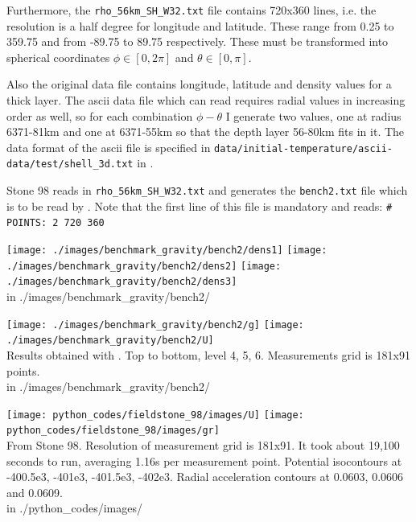 Furthermore, the {\tt rho\_56km\_SH\_W32.txt} file contains 720x360 lines, i.e. 
the resolution is a half degree for longitude and latitude. These range from 0.25
to 359.75 and from -89.75 to 89.75 respectively. These must be transformed into 
spherical coordinates $\phi\in[0,2\pi]$ and $\theta \in[0,\pi]$.

Also the original data file contains longitude, latitude and density values for 
a thick layer. The ascii data file which \aspect can read requires radial values 
in increasing order as well, 
so for each combination $\phi-\theta$ I generate two values, one at 
radius 6371-81km and one at 6371-55km so that the depth layer 56-80km fits in it.
The data format of the ascii file is specified in 
{\tt data/initial-temperature/ascii-data/test/shell\_3d.txt} in \aspect{}.

Stone 98 reads in {\tt rho\_56km\_SH\_W32.txt} 
and generates the {\tt bench2.txt} file which is to be read by \aspect{}.
Note that the first line of this file is mandatory and reads: 
{\tt \# POINTS: 2 720 360}

\begin{center}
\texttt{[image: ./images/benchmark\_gravity/bench2/dens1]}
\texttt{[image: ./images/benchmark\_gravity/bench2/dens2]}
\texttt{[image: ./images/benchmark\_gravity/bench2/dens3]}\\
{\tiny {\color{gray} in ./images/benchmark\_gravity/bench2/}}
\end{center}

\begin{center}
\texttt{[image: ./images/benchmark\_gravity/bench2/g]}
\texttt{[image: ./images/benchmark\_gravity/bench2/U]}\\
{\captionfont Results obtained with \aspect{}. Top to bottom, level 4, 5, 6.
Measurements grid is 181x91 points.\\
{\tiny {\color{gray} in ./images/benchmark\_gravity/bench2/}}
}
\end{center}

\begin{center}
\texttt{[image: python\_codes/fieldstone\_98/images/U]}
\texttt{[image: python\_codes/fieldstone\_98/images/gr]}\\
{\captionfont From Stone 98. Resolution of measurement grid is 181x91. It took 
about 19,100 seconds to run, averaging 1.16s per measurement point.  
Potential isocontours at -400.5e3, -401e3, -401.5e3, -402e3. 
Radial acceleration contours at 0.0603, 0.0606 and 0.0609.\\
{\tiny {\color{gray} in ./python\_codes/images/}}
}
\end{center}

